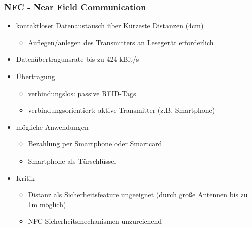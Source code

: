 \subsubsection{NFC - Near Field Communication}
\begin{itemize}
	\item kontaktloser Datenaustausch über Kürzeste Distanzen (4cm)
	\begin{itemize}
		\item Auflegen/anlegen des Transmitters an Lesegerät erforderlich
	\end{itemize}
	\item Datenübertragunsrate bis zu 424 kBit/s
	\item Übertragung
	\begin{itemize}
		\item verbindungslos: passive RFID-Tags
		\item verbindungsorientiert: aktive Transmitter (z.B. Smartphone)
	\end{itemize}
	\item mögliche Anwendungen
	\begin{itemize}
		\item Bezahlung per Smartphone oder Smartcard
		\item Smartphone als Türschlüssel
	\end{itemize}
	\item Kritik
	\begin{itemize}
		\item Distanz als Sicherheitsfeature ungeeignet (durch große Antennen bis zu 1m möglich) 
		\item NFC-Sicherheitsmechanismen unzureichend
	\end{itemize}
\end{itemize}